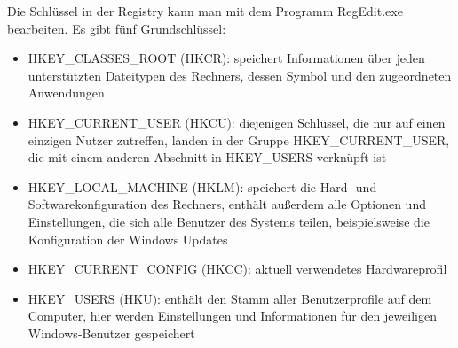 Die Schlüssel in der Registry kann man mit dem Programm RegEdit.exe bearbeiten. Es gibt fünf Grundschlüssel:
\begin{itemize}
	\item HKEY\_CLASSES\_ROOT (HKCR): speichert Informationen über jeden unterstützten Dateitypen des Rechners, dessen Symbol und den zugeordneten Anwendungen
	\item HKEY\_CURRENT\_USER (HKCU): diejenigen Schlüssel, die nur auf einen einzigen Nutzer zutreffen, landen in der Gruppe HKEY\_CURRENT\_USER, die mit einem anderen Abschnitt in HKEY\_USERS verknüpft ist
	\item HKEY\_LOCAL\_MACHINE (HKLM): speichert die Hard- und Softwarekonfiguration des Rechners, enthält außerdem alle Optionen und Einstellungen, die sich alle Benutzer des Systems teilen, beispielsweise die Konfiguration der Windows Updates
	\item HKEY\_CURRENT\_CONFIG (HKCC): aktuell verwendetes Hardwareprofil
	\item HKEY\_USERS (HKU): enthält den Stamm aller Benutzerprofile auf dem Computer, hier werden Einstellungen und Informationen für den jeweiligen Windows-Benutzer gespeichert
\end{itemize}







